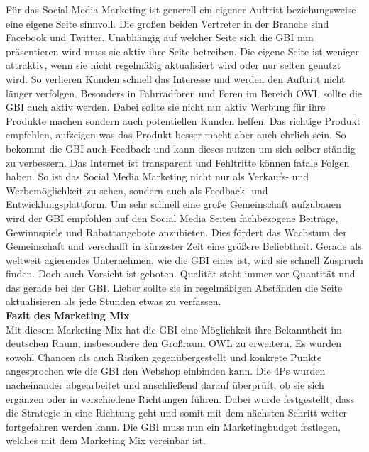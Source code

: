 Für das Social Media Marketing ist generell ein eigener Auftritt beziehungsweise eine eigene Seite sinnvoll. Die großen beiden Vertreter in der Branche sind Facebook und Twitter. Unabhängig auf welcher Seite sich die GBI nun präsentieren wird muss sie aktiv ihre Seite betreiben. Die eigene Seite ist weniger attraktiv, wenn sie nicht regelmäßig aktualisiert wird oder nur selten genutzt wird. So verlieren Kunden schnell das Interesse und werden den Auftritt nicht länger verfolgen. Besonders in Fahrradforen und Foren im Bereich OWL sollte die GBI auch aktiv werden. Dabei sollte sie nicht nur aktiv Werbung für ihre Produkte machen sondern auch potentiellen Kunden helfen. Das richtige Produkt empfehlen, aufzeigen was das Produkt besser macht aber auch ehrlich sein. So bekommt die GBI auch Feedback und kann dieses nutzen um sich selber ständig zu verbessern. Das Internet ist transparent und Fehltritte können fatale Folgen haben. So ist das Social Media Marketing nicht nur als Verkaufs- und Werbemöglichkeit zu sehen, sondern auch als Feedback- und Entwicklungsplattform. Um sehr schnell eine große Gemeinschaft aufzubauen wird der GBI empfohlen auf den Social Media Seiten fachbezogene Beiträge, Gewinnspiele und Rabattangebote anzubieten. Dies fördert das Wachstum der Gemeinschaft und verschafft in kürzester Zeit eine größere Beliebtheit. Gerade als weltweit agierendes Unternehmen, wie die GBI eines ist, wird sie schnell Zuspruch finden. Doch auch Vorsicht ist geboten. Qualität steht immer vor Quantität und das gerade bei der GBI. Lieber sollte sie in regelmäßigen Abständen die Seite aktualisieren als jede Stunden etwas zu verfassen.\\

\small{\textbf{Fazit des Marketing Mix}}\\
Mit diesem Marketing Mix hat die GBI eine Möglichkeit ihre Bekanntheit im deutschen Raum, insbesondere den Großraum OWL zu erweitern. Es wurden sowohl Chancen als auch Risiken gegenübergestellt und konkrete Punkte angesprochen wie die GBI den Webshop einbinden kann. Die 4Ps wurden nacheinander abgearbeitet und anschließend darauf überprüft, ob sie sich ergänzen oder in verschiedene Richtungen führen. Dabei wurde festgestellt, dass die Strategie in eine Richtung geht und somit mit dem nächsten Schritt weiter fortgefahren werden kann.  Die GBI muss nun ein Marketingbudget festlegen, welches mit dem Marketing Mix vereinbar ist.